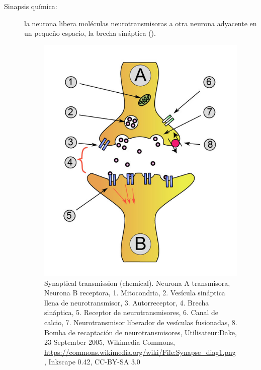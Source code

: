 \begin{description}
 \item [Sinapsis química:] la neurona libera moléculas neurotransmisoras a otra neurona adyacente en un pequeño espacio, la brecha sináptica (). %



\begin{figure}[h]
 \centering
 \includegraphics[scale=0.2]{../Figuras/SinapsisQuimica1.png}
 \caption{Synaptical transmission (chemical). Neurona A transmisora, Neurona B receptora, 1. Mitocondria, 2. Vesícula sináptica llena de neurotransmisor, 3. Autorreceptor, 4. Brecha sináptica, 5. Receptor de neurotransmisores, 6. Canal de calcio, 7. Neurotransmisor liberador de vesículas fusionadas, 8. Bomba de recaptación de neurotransmisores, Utilisateur:Dake, 23 September 2005, Wikimedia Commons, \url{https://commons.wikimedia.org/wiki/File:Synapse_diag1.png}, Inkscape 0.42, CC-BY-SA 3.0}
 \label{fig:sinapsisQ}
\end{figure}

\end{description}
